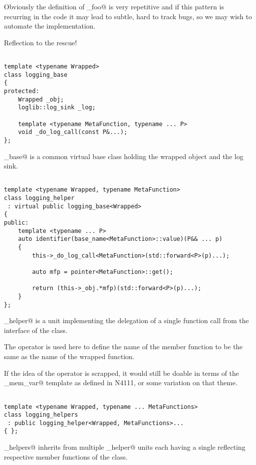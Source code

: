 Obviously the definition of \verb@logging_foo@ is very repetitive and if this
pattern is recurring in the code it may lead to subtle, hard to track bugs,
so we may wish to automate the implementation.

Reflection to the rescue!

\begin{verbatim}

template <typename Wrapped>
class logging_base
{
protected:
	Wrapped _obj;
	loglib::log_sink _log;

	template <typename MetaFunction, typename ... P>
	void _do_log_call(const P&...);
};

\end{verbatim}

\verb@logging_base@ is a common virtual base class holding the wrapped object
and the log sink.

\begin{verbatim}

template <typename Wrapped, typename MetaFunction>
class logging_helper
 : virtual public logging_base<Wrapped>
{
public:
	template <typename ... P>
	auto identifier(base_name<MetaFunction>::value)(P&& ... p)
	{
		this->_do_log_call<MetaFunction>(std::forward<P>(p)...);

		auto mfp = pointer<MetaFunction>::get();

		return (this->_obj.*mfp)(std::forward<P>(p)...);
	}
};

\end{verbatim}

\verb@logging_helper@ is a unit implementing the delegation of a single function
call from the interface of the \verb@Wrapped@ class. 

The \verb@identifier@ operator is used here to define the name of the member function
to be the same as the name of the wrapped function.

If the idea of the \verb@identifier@ operator is scrapped, it would still be doable
in terms of the \verb@named_mem_var@ template as defined in N4111, or some variation
on that theme.

\begin{verbatim}

template <typename Wrapped, typename ... MetaFunctions>
class logging_helpers
 : public logging_helper<Wrapped, MetaFunctions>...
{ };

\end{verbatim}

\verb@logging_helpers@ inherits from multiple \verb@logging_helper@ units
each having a single  reflecting respective member functions
of the \verb@Wrapper@ class.

